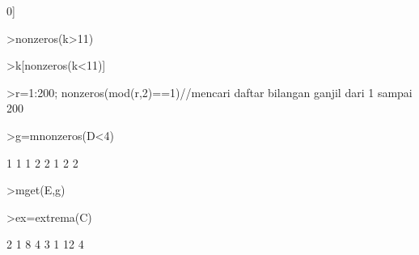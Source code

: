 \documentclass[12pt,arial,letterpaper]{book}
\begin{document}
\begin{eulercomment}
\begin{eulercomment}
\begin{euleroutput}
  0]
\end{euleroutput}
\begin{eulerprompt}
>nonzeros(k>11)
\end{eulerprompt}
\begin{euleroutput}
  [11,  12,  13,  14,  15,  16,  17,  18,  19]
\end{euleroutput}
\begin{eulerprompt}
>k[nonzeros(k<11)]
\end{eulerprompt}
\begin{euleroutput}
  [2,  3,  4,  5,  6,  7,  8,  9,  10]
\end{euleroutput}
\begin{eulerprompt}
>r=1:200; nonzeros(mod(r,2)==1)//mencari daftar bilangan ganjil dari 1 sampai 200
\end{eulerprompt}
\begin{euleroutput}
  [1,  3,  5,  7,  9,  11,  13,  15,  17,  19,  21,  23,  25,  27,  29,
  31,  33,  35,  37,  39,  41,  43,  45,  47,  49,  51,  53,  55,  57,
  59,  61,  63,  65,  67,  69,  71,  73,  75,  77,  79,  81,  83,  85,
  87,  89,  91,  93,  95,  97,  99,  101,  103,  105,  107,  109,  111,
  113,  115,  117,  119,  121,  123,  125,  127,  129,  131,  133,  135,
  137,  139,  141,  143,  145,  147,  149,  151,  153,  155,  157,  159,
  161,  163,  165,  167,  169,  171,  173,  175,  177,  179,  181,  183,
  185,  187,  189,  191,  193,  195,  197,  199]
\end{euleroutput}
\begin{eulerprompt}
>g=mnonzeros(D<4)
\end{eulerprompt}
\begin{euleroutput}
              1             1 
              1             2 
              2             1 
              2             2 
\end{euleroutput}
\begin{eulerprompt}
>mget(E,g)
\end{eulerprompt}
\begin{euleroutput}
  [3,  2,  4,  3]
\end{euleroutput}
\begin{eulerprompt}
>ex=extrema(C)
\end{eulerprompt}
\begin{euleroutput}
              2             1             8             4 
              3             1            12             4 
\end{euleroutput}
\begin{eulercomment}

\end{eulercomment}
\end{eulercomment}
\end{eulercomment}
\end{document}
